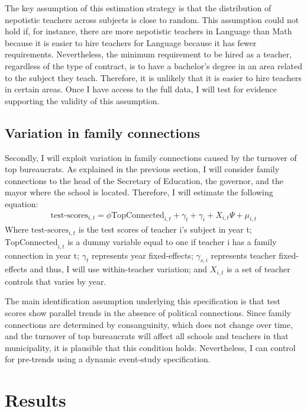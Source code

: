 \documentclass[12pt,runningheads]{article}
\begin{document}
The key assumption of this estimation strategy is that the distribution of nepotistic teachers across subjects is close to random. This assumption could not hold if, for instance, there are more nepotistic teachers in Language than Math because it is easier to hire teachers for Language because it has fewer requirements. Nevertheless, the minimum requirement to be hired as a teacher, regardless of the type of contract, is to have a bachelor's degree in an area related to the subject they teach. Therefore, it is unlikely that it is easier to hire teachers in certain areas. Once I have access to the full data, I will test for evidence supporting the validity of this assumption.


\subsection{Variation in family connections}
Secondly, I will exploit variation in family connections caused by the turnover of top bureaucrats. As explained in the previous section, I will consider family connections to the head of the Secretary of Education, the governor, and the mayor where the school is located. Therefore, I will estimate the following equation:
\begin{align}
\text{test-scores}_{i,t}= \phi \text{TopConnected}_{i,t} + \gamma_t + \gamma_{i} + X_{i,t}\Psi + \mu_{i,t}
\end{align}
Where $\text{test-scores}_{i,t}$ is the test scores of teacher i's subject in year t; $\text{TopConnected}_{i,t}$ is a dummy variable equal to one if teacher i has a family connection in year t; $\gamma_t$ represents year fixed-effects; $\gamma_{s,i}$ represents teacher fixed-effects and thus, I will use within-teacher variation; and $X_{i,t}$ is a set of teacher controls that varies by year. 

The main identification assumption underlying this specification is that test scores show parallel trends in the absence of political connections. Since family connections are determined by consanguinity, which does not change over time, and the turnover of top bureaucrats will affect all schools and teachers in that municipality, it is plausible that this condition holds. Nevertheless, I can control for pre-trends using a dynamic event-study specification. 

\section{Results}
\end{document}
